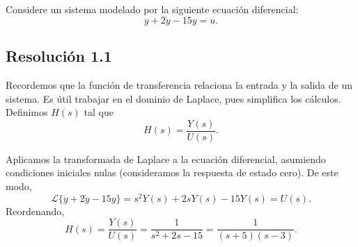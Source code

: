\documentclass[
  11pt,
  letterpaper,
   addpoints,
   answers
  ]{exam}
\begin{document}
\begin{questions}
  \question Considere un sistema modelado por la siguiente ecuación diferencial:
  \begin{equation}
    \ddot y + 2\dot y - 15 y = u.
  \end{equation}

\begin{solution}
  \subsection*{Resolución 1.1}
  Recordemos que la función de transferencia relaciona la entrada y la salida de un sistema. Es útil trabajar en el dominio de Laplace, pues simplifica los cálculos. Definimos \(H(s)\) tal que
  \begin{equation}
    H(s) = \frac{Y(s)}{U(s)}.
  \end{equation}

  Aplicamos la transformada de Laplace a la ecuación diferencial, asumiendo condiciones iniciales nulas (consideramos la respuesta de estado cero). De este modo,
  \begin{equation}
    \mathcal{L}\{\ddot y + 2\dot y - 15 y\}
    = s^{2}Y(s) + 2sY(s) - 15Y(s) = U(s).
  \end{equation}
  Reordenando,
  \begin{equation}
    H(s) = \frac{Y(s)}{U(s)} = \frac{1}{s^{2} + 2s - 15}
    = \frac{1}{(s+5)(s-3)}.
  \end{equation}

\end{solution}
\end{questions}
\end{document}
